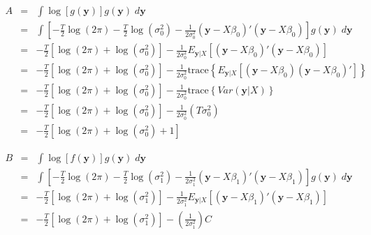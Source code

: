 \documentclass[12pt]{article}
\theoremstyle{definition}
\begin{document}
\begin{eqnarray*}
	A &=&\int \log[g(\mathbf{y})] g(\mathbf{y}) \; d \mathbf{y} \\
	&=& \int \left[-\frac{T}{2}\log(2\pi) -\frac{T}{2} \log(\sigma^2_0) - \frac{1}{2\sigma_0^2}\left(\textbf{y} - X\beta_0\right)'\left(\textbf{y} -X\beta_0\right) \right] g(\mathbf{y})\; d\mathbf{y}\\
	&=& -\frac{T}{2}\left[ \log(2\pi) + \log(\sigma^2_0)\right] -  \frac{1}{2\sigma_0^2} E_{\mathbf{y}|X}\left[\left(\textbf{y} - X\beta_0\right)'\left(\textbf{y} -X\beta_0\right)\right]\\
	&=& -\frac{T}{2}\left[ \log(2\pi) + \log(\sigma^2_0)\right] -  \frac{1}{2\sigma_0^2}\mbox{trace}\left\{ E_{\mathbf{y}|X}\left[\left(\textbf{y} - X\beta_0\right)\left(\textbf{y} -X\beta_0\right)'\right]\right\}\\
	&=& -\frac{T}{2}\left[ \log(2\pi) + \log(\sigma^2_0)\right] -  \frac{1}{2\sigma_0^2}\mbox{trace}\left\{ Var(\mathbf{y}|X)\right\}\\
	&=& -\frac{T}{2}\left[ \log(2\pi) + \log(\sigma^2_0)\right] -  \frac{1}{2\sigma_0^2}\left(T \sigma_0^2\right)\\
	&=& -\frac{T}{2}\left[ \log(2\pi) + \log(\sigma^2_0) +  1 \right]
\end{eqnarray*}


\begin{eqnarray*}
	B &=& \int \log[f(\mathbf{y})] g(\mathbf{y}) \; d \mathbf{y}\\
	&=& \int \left[ -\frac{T}{2}\log(2\pi) -\frac{T}{2} \log(\sigma^2_1) - \frac{1}{2\sigma_1^2}\left(\textbf{y} - X\beta_1\right)'\left(\textbf{y} -X\beta_1\right) \right] g(\mathbf{y})\;  d \mathbf{y}\\
		&=& -\frac{T}{2}\left[\log(2\pi) + \log(\sigma^2_1) \right]- \frac{1}{2\sigma_1^2}E_{\mathbf{y}|X}\left[\left(\textbf{y} - X\beta_1\right)'\left(\textbf{y} -X\beta_1\right)\right]\\
		&=&  -\frac{T}{2}\left[\log(2\pi) + \log(\sigma^2_1) \right] - \left(\frac{1}{2\sigma_1^2}\right)C
\end{eqnarray*}
\end{document}
